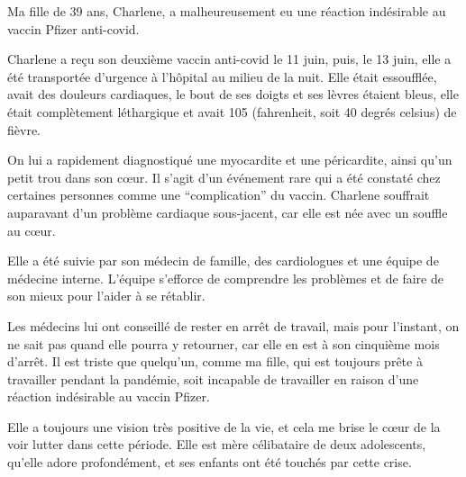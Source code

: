 Ma fille de 39 ans, Charlene, a malheureusement eu une réaction indésirable au
vaccin Pfizer anti-covid.

Charlene a reçu son deuxième vaccin anti-covid le 11 juin, puis, le 13 juin,
elle a été transportée d'urgence à l'hôpital au milieu de la nuit. Elle était
essoufflée, avait des douleurs cardiaques, le bout de ses doigts et ses lèvres
étaient bleus, elle était complètement léthargique et avait 105 (fahrenheit,
soit 40 degrés celsius) de fièvre.

On lui a rapidement diagnostiqué une myocardite et une péricardite, ainsi qu'un
petit trou dans son cœur. Il s'agit d'un événement rare qui a été constaté chez
certaines personnes comme une “complication” du vaccin. Charlene souffrait
auparavant d'un problème cardiaque sous-jacent, car elle est née avec un souffle
au cœur.

Elle a été suivie par son médecin de famille, des cardiologues et une équipe de
médecine interne. L'équipe s'efforce de comprendre les problèmes et de faire de
son mieux pour l'aider à se rétablir.

Les médecins lui ont conseillé de rester en arrêt de travail, mais pour
l'instant, on ne sait pas quand elle pourra y retourner, car elle en est à son
cinquième mois d'arrêt. Il est triste que quelqu'un, comme ma fille, qui est
toujours prête à travailler pendant la pandémie, soit incapable de travailler en
raison d'une réaction indésirable au vaccin Pfizer.

Elle a toujours une vision très positive de la vie, et cela me brise le cœur de
la voir lutter dans cette période. Elle est mère célibataire de deux
adolescents, qu'elle adore profondément, et ses enfants ont été touchés par
cette crise.

